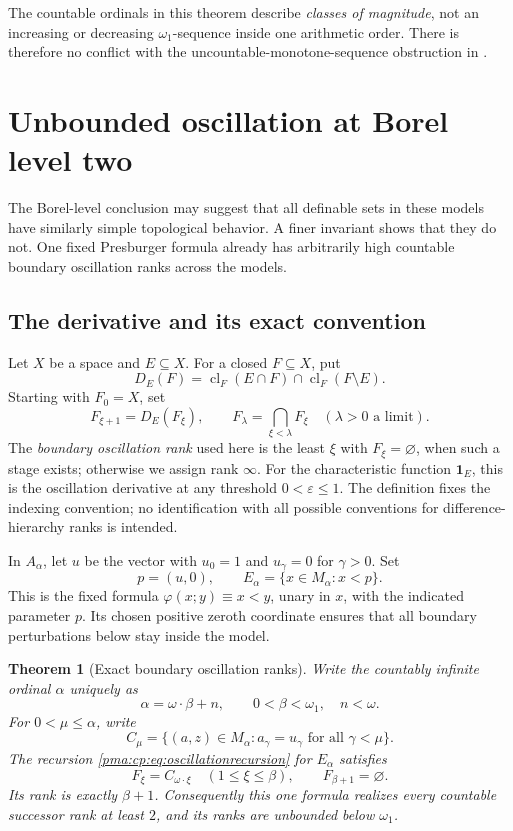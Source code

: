 \documentclass[11pt]{article}
\numberwithin{equation}{section}
\newtheorem{theorem}{Theorem}[section]
\theoremstyle{definition}
\theoremstyle{remark}
\newcommand{\one}{\mathbf 1}
\newcommand{\cl}{\operatorname{cl}}
\begin{document}
The countable ordinals in this theorem describe \emph{classes of
magnitude}, not an increasing or decreasing $\omega_1$-sequence inside
one arithmetic order. There is therefore no conflict with the
uncountable-monotone-sequence obstruction in \cite{EHW}.

\section{Unbounded oscillation at Borel level two}
\label{pma:cp:sec:oscillation}

The Borel-level conclusion may suggest that all definable sets in these
models have similarly simple topological behavior. A finer invariant shows
that they do not. One fixed Presburger formula already has arbitrarily
high countable boundary oscillation ranks across the models.

\subsection{The derivative and its exact convention}

Let $X$ be a space and $E\subseteq X$. For a closed $F\subseteq X$, put
\[
D_E(F)=\cl_F(E\cap F)\cap\cl_F(F\setminus E).
\]
Starting with $F_0=X$, set
\begin{equation}
\label{pma:cp:eq:oscillationrecursion}
F_{\xi+1}=D_E(F_\xi),\qquad
F_\lambda=\bigcap_{\xi<\lambda}F_\xi
\quad(\lambda>0\text{ a limit}).
\end{equation}
The \emph{boundary oscillation rank} used here is the least $\xi$ with
$F_\xi=\varnothing$, when such a stage exists; otherwise we assign rank
$\infty$. For the characteristic function $\one_E$, this is
the oscillation derivative at any threshold $0<\varepsilon\leq1$.
The definition fixes the indexing convention; no identification with all
possible conventions for difference-hierarchy ranks is intended.

In $A_\alpha$, let $u$ be the vector with $u_0=1$ and $u_\gamma=0$
for $\gamma>0$. Set
\[
p=(u,0),\qquad E_\alpha=\{x\in M_\alpha:x<p\}.
\]
This is the fixed formula $\varphi(x;y)\equiv x<y$, unary in $x$, with
the indicated parameter $p$. Its chosen positive zeroth coordinate ensures
that all boundary perturbations below stay inside the model.

\begin{theorem}[Exact boundary oscillation ranks]
\label{pma:cp:thm:oscillation}
Write the countably infinite ordinal $\alpha$ uniquely as
\[
\alpha=\omega\cdot\beta+n,
\qquad 0<\beta<\omega_1,\quad n<\omega.
\]
For $0<\mu\leq\alpha$, write
\[
C_\mu=\{(a,z)\in M_\alpha:a_\gamma=u_\gamma
\text{ for all }\gamma<\mu\}.
\]
The recursion \eqref{pma:cp:eq:oscillationrecursion} for $E_\alpha$ satisfies
\begin{equation}
\label{pma:cp:eq:exactrank}
F_\xi=C_{\omega\cdot\xi}\quad(1\leq\xi\leq\beta),
\qquad F_{\beta+1}=\varnothing.
\end{equation}
Its rank is exactly $\beta+1$. Consequently this one formula realizes
every countable successor rank at least $2$, and its ranks are unbounded
below $\omega_1$.
\end{theorem}
\end{document}
